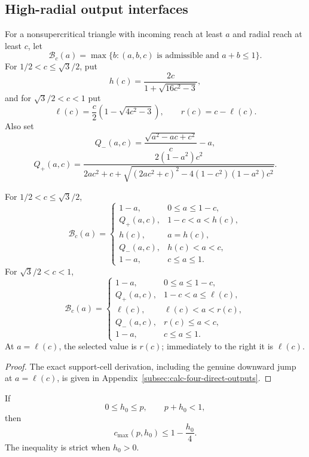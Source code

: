 \subsection{High-radial output interfaces}
\label{subsec:high-radial-interfaces}

For a nonsupercritical triangle with incoming reach at least $a$ and radial
reach at least $c$, let
\[
 \mathcal B_c(a)=
 \max\{b:(a,b,c)\text{ is admissible and }a+b\le1\}.
\]
For $1/2<c\le\sqrt3/2$, put
\[
 h(c)=\frac{2c}{1+\sqrt{16c^2-3}},
\]
and for $\sqrt3/2<c<1$ put
\[
 \ell(c)=\frac c2\left(1-\sqrt{4c^2-3}\right),
 \qquad r(c)=c-\ell(c).
\]
Also set
\[
 Q_-(a,c)=\frac{\sqrt{a^2-ac+c^2}}c-a,
\]
\[
 Q_+(a,c)=
 \frac{2(1-a^2)c^2}
 {2ac^2+c+
 \sqrt{(2ac^2+c)^2-4(1-c^2)(1-a^2)c^2}}.
\]

\begin{proposition}
\label{prop:new-four-direct-outputs}
For $1/2<c\le\sqrt3/2$,
\[
 \mathcal B_c(a)=
 \begin{cases}
  1-a,&0\le a\le1-c,\\
  Q_+(a,c),&1-c<a<h(c),\\
  h(c),&a=h(c),\\
  Q_-(a,c),&h(c)<a<c,\\
  1-a,&c\le a\le1.
 \end{cases}
 \tag{6.66}
\]
For $\sqrt3/2<c<1$,
\[
 \mathcal B_c(a)=
 \begin{cases}
  1-a,&0\le a\le1-c,\\
  Q_+(a,c),&1-c<a\le\ell(c),\\
  \ell(c),&\ell(c)<a<r(c),\\
  Q_-(a,c),&r(c)\le a<c,\\
  1-a,&c\le a\le1.
 \end{cases}
 \tag{6.67}
\]
At $a=\ell(c)$, the selected value is $r(c)$; immediately to the right it is
$\ell(c)$.
\end{proposition}

\begin{proof}
The exact support-cell derivation, including the genuine downward jump at
$a=\ell(c)$, is given in Appendix~\ref{subsec:calc-four-direct-outputs}.
\end{proof}

\begin{lemma}
\label{lem:new-quarter-radial-envelope}
If
\[
 0\le h_0\le p,
 \qquad p+h_0<1,
\]
then
\[
 \boxed{c_{\max}(p,h_0)\le1-\frac{h_0}{4}.}
 \tag{6.69}
\]
The inequality is strict when $h_0>0$.
\end{lemma}

